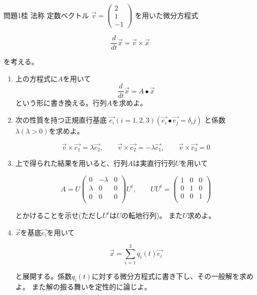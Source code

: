 \documentclass[fleqn]{jbook}
\begin{document}
\begin{question}{問題1}{桂  法称}
定数ベクトル
$\overrightarrow{v} = \left(
\begin{array}{c}
   2\\
   1\\
  -1
\end{array}\right)$
を用いた微分方程式

$$\frac{d}{dt}\overrightarrow{x} =
  \overrightarrow {v} \times \overrightarrow{x}$$

を考える。\\

\begin{enumerate}
\item
上の方程式に$A$を用いて
$$\frac {d}{dt} \overrightarrow{x} =
  A \bullet \overrightarrow{x}$$
という形に書き換える。行列$A$を求めよ。

\item
次の性質を持つ正規直行基底
    $\overrightarrow{e_i}(i=1,2,3)
    (\overrightarrow{e_i} \bullet
     \overrightarrow{e_j} = \delta_ij)$
と係数$\lambda (\lambda > 0)$を求めよ。

$$\overrightarrow{v} \times \overrightarrow{e_1} =
      \lambda \overrightarrow{e_2} , \qquad
      \overrightarrow{v} \times \overrightarrow{e_2} =
     -\lambda \overrightarrow{e_1} , \qquad
      \overrightarrow{v} \times \overrightarrow{e_3} =
      0$$

\item
上で得られた結果を用いると、行列$A$は実直行行列$U$を用いて

$$ A = U  \left(
      \begin{array}{ccc}
        0 & -\lambda & 0 \\
        \lambda  & 0 & 0 \\
        0 & 0 & 0        \\
      \end{array} \right)
      U^t , \qquad
       UU^t = \left(
      \begin{array}{ccc}
        1 & 0 & 0 \\
        0 & 1 & 0 \\
        0 & 0 & 1 \\
      \end{array} \right)$$

とかけることを示せ(ただし$U^t$は$U$の転地行列)。
また$U$求めよ。

\item
$\overrightarrow{x}$を基底$\overrightarrow{e_i}$を用いて

$$\overrightarrow{x} =
      \sum_{i=1} ^3 q_i(t) \overrightarrow{e_i}$$

と展開する。係数$q_i(t)$に対する微分方程式に書き下し、その一般解を求めよ。
また解の振る舞いを定性的に論じよ。
\end{enumerate}
\end{question}
\end{document}
